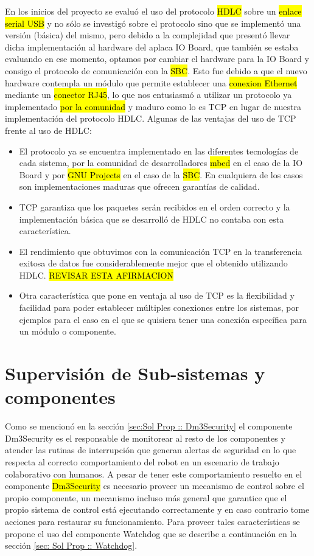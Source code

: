 \documentclass[withindex,glossary]{cam-thesis}
\begin{document}
En los inicios del proyecto se evaluó el uso del protocolo \hl{HDLC} sobre un \hl{enlace serial USB} y no sólo se investigó sobre el protocolo sino que se implementó una versión (básica) del mismo, pero debido a la complejidad que presentó llevar dicha implementación al hardware del aplaca IO Board, que también se estaba evaluando en ese momento, optamos por cambiar el hardware para la IO Board y consigo el protocolo de comunicación con la \hl{SBC}. Esto fue debido a que el nuevo hardware contempla un módulo que permite establecer una \hl{conexion Ethernet} mediante un \hl{conector RJ45}, lo que nos entusiasmó a utilizar un protocolo ya implementado \hl{por la comunidad} y maduro como lo es TCP en lugar de nuestra implementación del protocolo HDLC.
Algunas de las ventajas del uso de TCP frente al uso de HDLC:
\begin{itemize}
\item El protocolo ya se encuentra implementado en las diferentes tecnologías de cada sistema, por la comunidad de desarrolladores \hl{mbed} en el caso de la IO Board y por \hl{GNU Projects} en el caso de la \hl{SBC}. En cualquiera de los casos son implementaciones maduras que ofrecen garantías de calidad.
\item TCP garantiza que los paquetes serán recibidos en el orden correcto y la implementación básica que se desarrolló de HDLC no contaba con esta característica.
\item El rendimiento que obtuvimos con la comunicación TCP en la transferencia exitosa de datos fue considerablemente mejor que el obtenido utilizando HDLC. \hl{REVISAR ESTA AFIRMACION}
\item Otra característica que pone en ventaja al uso de TCP es la flexibilidad y facilidad para poder establecer múltiples conexiones entre los sistemas, por ejemplos para el caso en el que se quisiera tener una conexión específica para un módulo o componente.
\end{itemize}

\section{Supervisión de Sub-sistemas y componentes}
Como se mencionó en la sección \ref{sec:Sol Prop :: Dm3Security} el componente Dm3Security es el responsable de monitorear al resto de los componentes  y atender las rutinas de interrupción que generan alertas de seguridad en lo que respecta al correcto comportamiento del robot en un escenario de trabajo colaborativo con humanos. A pesar de tener este comportamiento resuelto en el componente \hl{Dm3Security} es necesario proveer un mecanismo de control sobre el propio componente, un mecanismo incluso más general que garantice que el propio sistema de control está ejecutando correctamente y en caso contrario tome acciones para restaurar su funcionamiento.
Para proveer tales características se propone el uso del componente Watchdog que se describe a continuación en la sección  \ref{sec: Sol Prop :: Watchdog}.
\end{document}
